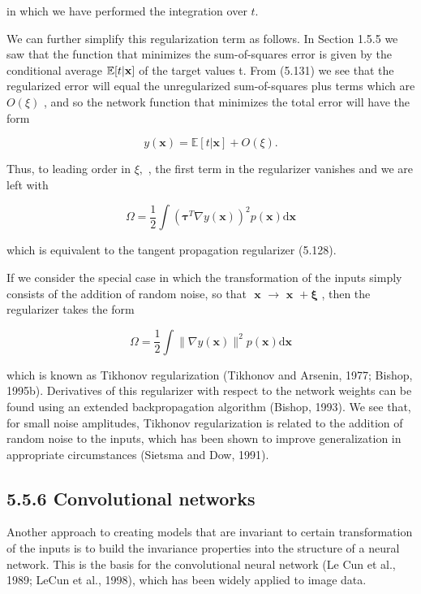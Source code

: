 \documentclass[
  10
]{article}
\begin{document}
in which we have performed the integration over \(t .\)

We can further simplify this regularization term as follows. In Section
1.5.5 we saw that the function that minimizes the sum-of-squares error
is given by the conditional average \(\mathbb { E } [ t | { \bf x } ]\)
of the target values t. From (5.131) we see that the regularized error
will equal the unregularized sum-of-squares plus terms which are
\(O ( \xi )\) , and so the network function that minimizes the total
error will have the form

\[
y (\mathbf {x}) = \mathbb {E} [ t | \mathbf {x} ] + O (\xi).\tag{5.133}
\]

Thus, to leading order in \(\xi ,\) , the first term in the regularizer
vanishes and we are left with

\[
\Omega = \frac {1}{2} \int \left(\pmb {\tau} ^ {T} \nabla y (\mathbf {x})\right) ^ {2} p (\mathbf {x}) \mathrm{d} \mathbf {x}\tag{5.134}
\]

which is equivalent to the tangent propagation regularizer (5.128).

If we consider the special case in which the transformation of the
inputs simply consists of the addition of random noise, so that
\(\textbf { x } \longrightarrow \textbf { x } + \pmb { \xi }\) , then
the regularizer takes the form

\[
\Omega = \frac {1}{2} \int \| \nabla y (\mathbf {x}) \| ^ {2} p (\mathbf {x}) \mathrm{d} \mathbf {x}\tag{5.135}
\]

which is known as Tikhonov regularization (Tikhonov and Arsenin, 1977;
Bishop, 1995b). Derivatives of this regularizer with respect to the
network weights can be found using an extended backpropagation algorithm
(Bishop, 1993). We see that, for small noise amplitudes, Tikhonov
regularization is related to the addition of random noise to the inputs,
which has been shown to improve generalization in appropriate
circumstances (Sietsma and Dow, 1991).

\subsection{5.5.6 Convolutional networks}\label{convolutional-networks}

Another approach to creating models that are invariant to certain
transformation of the inputs is to build the invariance properties into
the structure of a neural network. This is the basis for the
convolutional neural network (Le Cun et al., 1989; LeCun et al., 1998),
which has been widely applied to image data.
\end{document}

